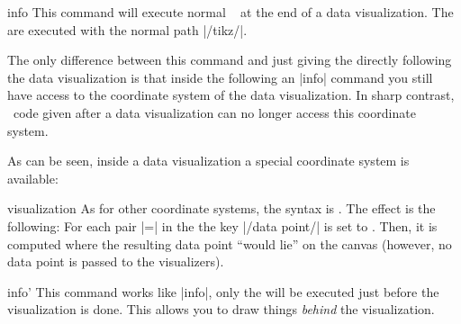 \begin{datavisualizationoperation}{info}{}
  This command will execute normal \tikzname\  at the end
  of a data visualization. The  are executed with the
  normal path |/tikz/|.

  The only difference between this command and just giving the
   directly following the data visualization is that inside
  the  following an |info| command you still have access
  to the coordinate system of the data visualization. In sharp
  contrast, \tikzname\ code given after a data visualization can no
  longer access this coordinate system.


\begin{codeexample}[]
\end{codeexample}

  As can be seen, inside a data visualization a special coordinate
  system is available:

  \begin{coordinatesystem}{visualization}
    As for other coordinate systems, the syntax is
    . The effect is the following:
    For each pair |=| in the 
    the key |/data point/| is set to
    . Then, it is computed where the resulting data point
    ``would lie'' on the canvas (however, no data point is passed to
    the visualizers).
  \end{coordinatesystem}
\end{datavisualizationoperation}

\begin{datavisualizationoperation}{info'}{}
  This command works like |info|, only the  will be
  executed just before the visualization is done. This allows you to
  draw things \emph{behind} the visualization.

\begin{codeexample}[]
\end{codeexample}
\end{datavisualizationoperation}


